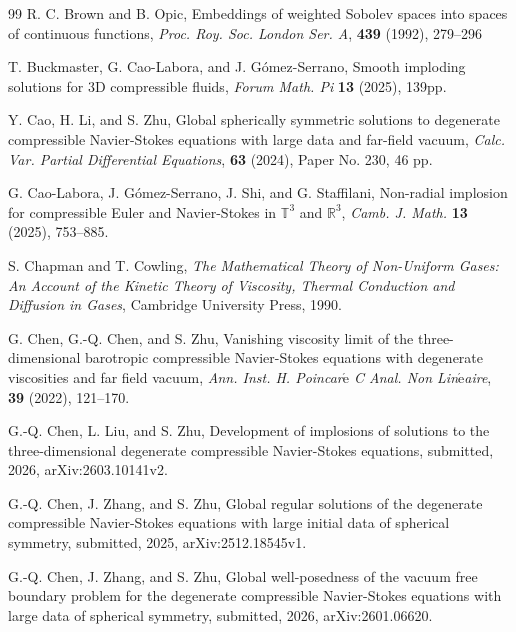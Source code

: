 \documentclass[11pt,reqno]{amsart}
\numberwithin{rk}{section}
\numberwithin{prop}{section}
\numberwithin{mydef}{section}
\numberwithin{lem}{section}
\numberwithin{equation}{section}
\numberwithin{thm}{section}
\begin{document}
\begin{thebibliography}{99}
 R. C. Brown and B. Opic, Embeddings of weighted Sobolev spaces into spaces of continuous functions, \textit{Proc. Roy. Soc. London Ser. A}, \textbf{439} (1992), 279--296


 T. Buckmaster, G. Cao-Labora, and J. G\'omez-Serrano, Smooth imploding solutions for 3D compressible fluids, \textit{Forum  Math. Pi} \textbf{13} (2025), 139pp.





 Y. Cao, H. Li, and S. Zhu, Global spherically symmetric solutions to degenerate compressible Navier-Stokes equations with large data and far-field vacuum, \textit{Calc. Var. Partial Differential Equations},  \textbf{63} (2024), Paper No. 230, 46 pp.


 G. Cao-Labora, J. Gómez-Serrano, J. Shi, and G. Staffilani, Non-radial implosion for compressible Euler and Navier-Stokes in
$\mathbb{T}^3$ and $\mathbb{R}^3$,   \textit{Camb. J.  Math.} \textbf{13} (2025), 753--885.


 S. Chapman and T.  Cowling, \textit{ The Mathematical Theory of Non-Uniform Gases: An Account of the Kinetic Theory of Viscosity,
Thermal Conduction and Diffusion in Gases}, Cambridge University Press, 1990.

 G. Chen, G.-Q. Chen, and  S. Zhu,  Vanishing viscosity limit of the   three-dimensional barotropic compressible  Navier-Stokes equations with degenerate viscosities and far field vacuum,   \textit{Ann. Inst. H. Poincar$\acute{\text{e}}$ C Anal. Non Lin$\acute{\text{e}}$aire}, \textbf{39} (2022),  121--170.





    
G.-Q. Chen, L. Liu, and S. Zhu,
Development of  implosions of solutions to the three-dimensional  degenerate compressible Navier-Stokes equations, submitted, 2026, arXiv:2603.10141v2.


 G.-Q. Chen, J. Zhang, and S. Zhu,  Global regular solutions of the degenerate compressible Navier-Stokes equations with large initial data of spherical symmetry, submitted, 2025, arXiv:2512.18545v1.

 G.-Q. Chen, J. Zhang, and S. Zhu, 
Global well-posedness of the vacuum free boundary problem for the degenerate compressible  Navier-Stokes equations with large  data of spherical symmetry, submitted, 2026, arXiv:2601.06620.





\end{thebibliography}
\end{document}
